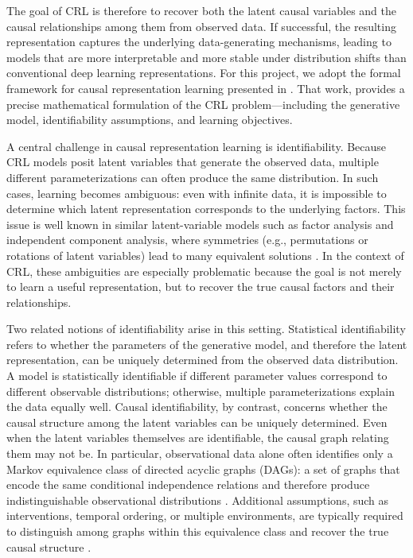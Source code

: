 \documentclass{article} %
\begin{document}
The goal of CRL is therefore to recover both the latent causal variables and the causal relationships among them from observed data. If successful, the resulting representation captures the underlying data-generating mechanisms, leading to models that are more interpretable and more stable under distribution shifts than conventional deep learning representations. For this project, we adopt the formal framework for causal representation learning presented in \citet{Moran2026CRLFramework}. That work, provides a precise mathematical formulation of the CRL problem—including the generative model, identifiability assumptions, and learning objectives.

A central challenge in causal representation learning is identifiability. Because CRL models posit latent variables that generate the observed data, multiple different parameterizations can often produce the same distribution. In such cases, learning becomes ambiguous: even with infinite data, it is impossible to determine which latent representation corresponds to the underlying factors. This issue is well known in similar latent-variable models such as factor analysis and independent component analysis, where symmetries (e.g., permutations or rotations of latent variables) lead to many equivalent solutions \cite{AndersonRubin1956Factor}. In the context of CRL, these ambiguities are especially problematic because the goal is not merely to learn a useful representation, but to recover the true causal factors and their relationships.

Two related notions of identifiability arise in this setting. Statistical identifiability refers to whether the parameters of the generative model, and therefore the latent representation, can be uniquely determined from the observed data distribution. A model is statistically identifiable if different parameter values correspond to different observable distributions; otherwise, multiple parameterizations explain the data equally well. Causal identifiability, by contrast, concerns whether the causal structure among the latent variables can be uniquely determined. Even when the latent variables themselves are identifiable, the causal graph relating them may not be. In particular, observational data alone often identifies only a Markov equivalence class of directed acyclic graphs (DAGs): a set of graphs that encode the same conditional independence relations and therefore produce indistinguishable observational distributions \cite{Lauritzen1996GraphicalModels, Drton2023MarkovEquivalence}. Additional assumptions, such as interventions, temporal ordering, or multiple environments, are typically required to distinguish among graphs within this equivalence class and recover the true causal structure \cite{Squires2023CausalDiscovery, JiangAragam2023DAGLearning}.
\end{document}
